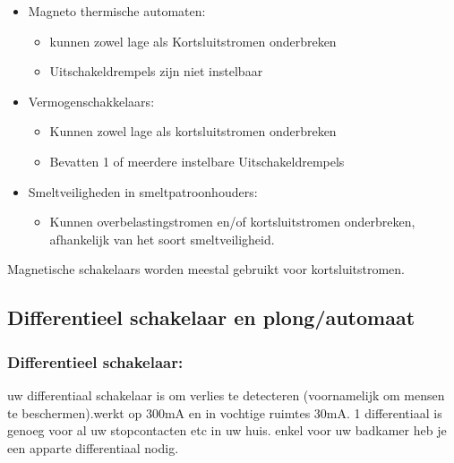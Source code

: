 \documentclass[12pt]{article}
\begin{document}
\begin{itemize}
    \item Magneto thermische automaten:\begin{itemize}
        \item kunnen zowel lage als Kortsluitstromen onderbreken
        \item Uitschakeldrempels zijn niet instelbaar
    \end{itemize}
    \item Vermogenschakkelaars:\begin{itemize}
        \item Kunnen zowel lage als kortsluitstromen onderbreken 
        \item Bevatten 1 of meerdere instelbare Uitschakeldrempels
    \end{itemize}
    \item Smeltveiligheden in smeltpatroonhouders:\begin{itemize}
        \item Kunnen overbelastingstromen en/of kortsluitstromen onderbreken, afhankelijk van het soort smeltveiligheid.
    \end{itemize}
\end{itemize}
Magnetische schakelaars worden meestal gebruikt voor kortsluitstromen.
\subsection{Differentieel schakelaar en plong/automaat}
\subsubsection{Differentieel schakelaar:} uw differentiaal schakelaar is om verlies te detecteren (voornamelijk om mensen te beschermen).werkt op 300mA en in vochtige ruimtes 30mA.
1 differentiaal is genoeg voor al uw stopcontacten etc in uw huis. enkel voor uw badkamer heb je een apparte differentiaal nodig.
\end{document}
